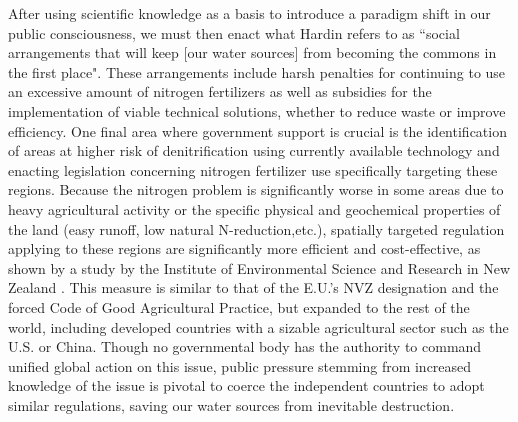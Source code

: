\documentclass[12pt]{article}
\begin{document}
	After using scientific knowledge as a basis to introduce a paradigm shift in our public consciousness, we must then enact what Hardin refers to as “social arrangements that will keep [our water sources] from becoming the commons in the first place". These arrangements include harsh penalties for continuing to use an excessive amount of nitrogen fertilizers as well as subsidies for the implementation of viable technical solutions, whether to reduce waste or improve efficiency. One final area where government support is crucial is the identification of areas at higher risk of denitrification using currently available technology and enacting legislation concerning nitrogen fertilizer use specifically targeting these regions. Because the nitrogen problem is significantly worse in some areas due to heavy agricultural activity or the specific physical and geochemical properties of the land (easy runoff, low natural N-reduction,etc.), spatially targeted regulation applying to these regions are significantly more efficient and cost-effective, as shown by a study by the Institute of Environmental Science and Research in New Zealand \cite{sarris19}. This measure is similar to that of the E.U.'s NVZ designation and the forced Code of Good Agricultural Practice, but expanded to the rest of the world, including developed countries with a sizable agricultural sector such as the U.S. or China. Though no governmental body has the authority to command unified global action on this issue, public pressure stemming from increased knowledge of the issue is pivotal to coerce the independent countries to adopt similar regulations, saving our water sources from inevitable destruction.
	
\end{document}
